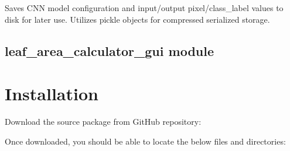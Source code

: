 \documentclass[letterpaper,10pt,english]{sphinxmanual}
\begin{document}

\begin{fulllineitems}
\label{\detokenize{basefunctions:basefunctions.saveToDisk}}
Saves CNN model configuration and input/output pixel/class\_label values to disk for later use. Utilizes pickle objects for compressed serialized storage.

\end{fulllineitems}



\section{leaf\_area\_calculator\_gui module}
\label{\detokenize{leaf_area_calculator_gui:leaf-area-calculator-gui-module}}\label{\detokenize{leaf_area_calculator_gui::doc}}

\chapter{Installation}
\label{\detokenize{install:installation}}\label{\detokenize{install::doc}}
Download the source package from GitHub repository:

%
\begin{sphinxVerbatim}[commandchars=\\\{\}]
\end{sphinxVerbatim}

Once downloaded, you should be able to locate the below files and directories:
\end{document}
